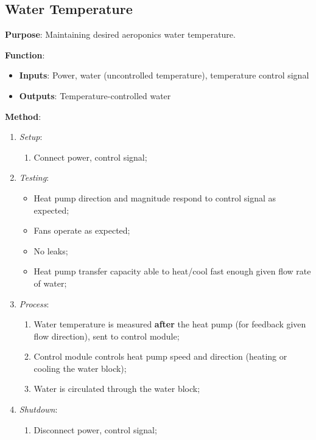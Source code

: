 \subsection{Water Temperature}
\label{sec:watertemp}

\textbf{Purpose}: Maintaining desired aeroponics water temperature.

\textbf{Function}: 
\begin{itemize}
    \item \textbf{Inputs}: Power, water (uncontrolled temperature), temperature control signal
    \item \textbf{Outputs}: Temperature-controlled water
\end{itemize}

\textbf{Method}:
\begin{enumerate}
    \item \textit{Setup}:
    \begin{enumerate}
        \item Connect power, control signal;
    \end{enumerate}
    \item \textit{Testing}:
    \begin{itemize}
        \item Heat pump direction and magnitude respond to control signal as expected;
        \item Fans operate as expected;
        \item No leaks;
        \item Heat pump transfer capacity able to heat/cool fast enough given flow rate of water;
    \end{itemize}
    \item \textit{Process}:
    \begin{enumerate}
        \item Water temperature is measured \textbf{after} the heat pump (for feedback given flow direction), sent to control module;
        \item Control module controls heat pump speed and direction (heating or cooling the water block);
        \item Water is circulated through the water block;
    \end{enumerate}
    \item \textit{Shutdown}:
    \begin{enumerate}
        \item Disconnect power, control signal;
    \end{enumerate}
\end{enumerate}


